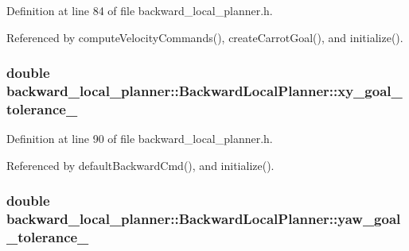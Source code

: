 Definition at line 84 of file backward\+\_\+local\+\_\+planner.\+h.



Referenced by compute\+Velocity\+Commands(), create\+Carrot\+Goal(), and initialize().

\subsubsection[{\texorpdfstring{xy\+\_\+goal\+\_\+tolerance\+\_\+}{xy_goal_tolerance_}}]{\setlength{\rightskip}{0pt plus 5cm}double backward\+\_\+local\+\_\+planner\+::\+Backward\+Local\+Planner\+::xy\+\_\+goal\+\_\+tolerance\+\_\+\hspace{0.3cm}{\ttfamily [private]}}\hypertarget{classbackward__local__planner_1_1BackwardLocalPlanner_accf76d17d29c3b798fc4ec7841273b7c}{}\label{classbackward__local__planner_1_1BackwardLocalPlanner_accf76d17d29c3b798fc4ec7841273b7c}


Definition at line 90 of file backward\+\_\+local\+\_\+planner.\+h.



Referenced by default\+Backward\+Cmd(), and initialize().

\subsubsection[{\texorpdfstring{yaw\+\_\+goal\+\_\+tolerance\+\_\+}{yaw_goal_tolerance_}}]{\setlength{\rightskip}{0pt plus 5cm}double backward\+\_\+local\+\_\+planner\+::\+Backward\+Local\+Planner\+::yaw\+\_\+goal\+\_\+tolerance\+\_\+\hspace{0.3cm}{\ttfamily [private]}}\hypertarget{classbackward__local__planner_1_1BackwardLocalPlanner_ad402f445e3358e233e4cbcc31def86c7}{}\label{classbackward__local__planner_1_1BackwardLocalPlanner_ad402f445e3358e233e4cbcc31def86c7}


